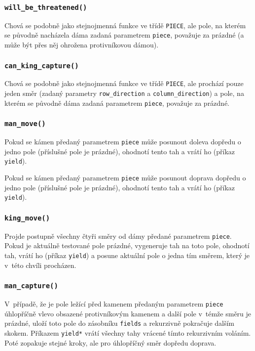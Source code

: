 \documentclass[a4paper,12pt]{article}
\begin{document}
	\subsubsection*{\texttt{will\_be\_threatened()}}
	Chová se podobně jako stejnojmenná funkce ve třídě \texttt{PIECE}, ale pole, na kterém se původně nacházela
	dáma zadaná parametrem \texttt{piece}, považuje za prázdné (a může být přes něj ohrožena protivníkovou dámou).
	
	\subsubsection*{\texttt{can\_king\_capture()}}
	Chová se podobně jako stejnojmenná funkce ve třídě \texttt{PIECE}, ale prochází pouze jeden směr
	(zadaný parametry \texttt{row\_direction} a \texttt{column\_direction}) a pole, na kterém se původně
	dáma zadaná parametrem \texttt{piece}, považuje za prázdné.
	
	\subsubsection*{\texttt{man\_move()}}
	Pokud se kámen předaný parametrem \texttt{piece} může posunout
	doleva dopředu o jedno pole (příslušné pole je prázdné), ohodnotí
	tento tah a vrátí ho (příkaz \texttt{yield}).
	
	Pokud se kámen předaný parametrem \texttt{piece} může posunout
	doprava dopředu o jedno pole (příslušné pole je prázdné), ohodnotí
	tento tah a vrátí ho (příkaz \texttt{yield}).
	
	\subsubsection*{\texttt{king\_move()}}
	Projde postupně všechny čtyři směry od dámy předané parametrem \texttt{piece}.
	Pokud je aktuálně testované pole prázdné, vygeneruje tah na toto pole, ohodnotí
	tah, vrátí ho (příkaz \texttt{yield}) a posune aktuální pole o jedna tím směrem,
	který je v~této chvíli procházen.
	
	\subsubsection*{\texttt{man\_capture()}}
	V~případě, že je pole ležící před kamenem předaným parametrem \texttt{piece}
	úhlopříčně vlevo obsazené protivníkovým kamenem a další pole v~témže směru
	je prázdné, uloží toto pole do zásobníku \texttt{fields} a rekurzivně pokračuje
	dalším skokem. Příkazem \texttt{yield*} vrátí všechny tahy vrácené tímto
	rekurzivním voláním. Poté zopakuje stejné kroky, ale pro úhlopříčný směr
	dopředu doprava.
	
\end{document}
